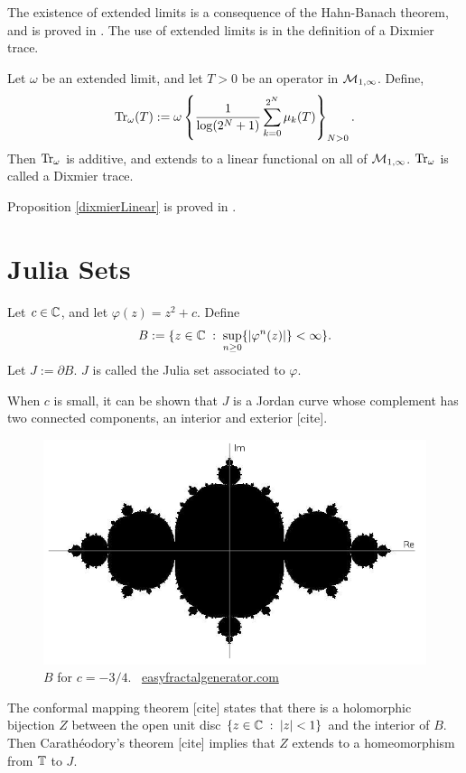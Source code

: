 The existence of extended limits is a consequence of the Hahn-Banach theorem,
and is proved in \cite[Thm 6.2.5]{SingularTraces}. The use
of extended limits is in the definition of a Dixmier trace.

\begin{proposition}
\label{dixmierLinear}
    Let $\omega$ be an extended limit, and let $T > 0$ be an operator
    in $\mathcal{M}_{1,\infty}$. Define,
    \begin{equation}
        \operatorname{Tr}_\omega(T) := \omega\left\{\frac{1}{\log(2^N+1)}\sum_{k=0}^{2^N} \mu_k(T)\right\}_{N > 0}.
    \end{equation}
    Then $\operatorname{Tr}_\omega$ is additive, and extends to a linear functional
    on all of $\mathcal{M}_{1,\infty}$. $\operatorname{Tr}_\omega$ is called a Dixmier trace.
\end{proposition}
Proposition \ref{dixmierLinear} is proved in \cite[Ch. 2]{SingularTraces}.
\section{Julia Sets}
\begin{definition}
    Let $c \in \mathbb{C}$, and let $\varphi(z) = z^2+c$. Define
    \begin{equation}
        B := \{z \in \mathbb{C}\;:\; \sup_{n\geq 0}\{|\varphi^n(z)|\} < \infty\}.
    \end{equation}
    Let $J:= \partial B$. $J$ is called the Julia set associated
    to $\varphi$.
    
    When $c$ is small, it can be shown that $J$ is a Jordan curve
    whose complement has two connected components, an interior and exterior [cite].
\end{definition}
\begin{figure}[h]
    \includegraphics[width=140mm]{Figures/juliaAxes.png}
\caption{$B$ for $c = -3/4$. \textcopyright \, \href{http://www.easyfractalgenerator.com/}{easyfractalgenerator.com}}
\end{figure}
The conformal mapping theorem [cite] states that there is a holomorphic
bijection $Z$ between the open unit disc $\{z \in \mathbb{C}\;:\;|z| < 1\}$
and the interior of $B$. Then Carath\'eodory's theorem [cite]
 implies that $Z$ extends to a homeomorphism from $\mathbb{T}$ to $J$. 


